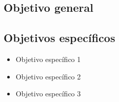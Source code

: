 \subsection*{Objetivo general}
\subsection*{Objetivos espec\'ificos}
\begin{itemize}
    \item Objetivo espec\'ifico 1
    \item Objetivo espec\'ifico 2
    \item Objetivo espec\'ifico 3
\end{itemize}